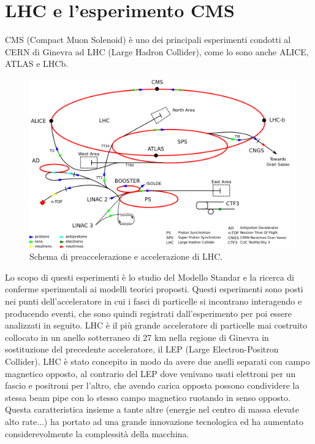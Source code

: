 \section{LHC e l'esperimento CMS}
CMS (Compact Muon Solenoid) è uno dei principali esperimenti condotti al CERN di Ginevra ad LHC (Large Hadron Collider), come lo sono anche ALICE, ATLAS e  LHCb. 

\begin{figure}
\centering
\includegraphics[scale=0.25]{Immagini/LHC}
\caption{Schema di preaccelerazione e accelerazione di LHC.}
\label{fig:LHC}
\end{figure}

Lo scopo di questi esperimenti è lo studio del Modello Standar e la ricerca di conferme sperimentali ai modelli teorici proposti. Questi esperimenti sono posti nei punti dell'acceleratore in cui i fasci di particelle si  incontrano interagendo e producendo eventi, che sono quindi registrati dall'esperimento per poi essere analizzati in seguito.
LHC è il più grande acceleratore di particelle mai costruito collocato in un anello sotterraneo di 27 km nella regione di Ginevra in sostituzione del precedente acceleratore, il LEP (Large Electron-Positron Collider).
LHC è stato concepito in modo da avere due anelli separati con campo magnetico opposto, al contrario del LEP dove venivano usati elettroni per un fascio e positroni per l'altro, che avendo carica opposta possono condividere la stessa beam pipe con lo stesso campo magnetico ruotando in senso opposto. 
Questa caratteristica insieme a tante altre (energie nel centro di massa elevate alto rate...) ha portato ad una grande innovazione tecnologica ed ha aumentato considerevolmente la complessità della macchina. 

